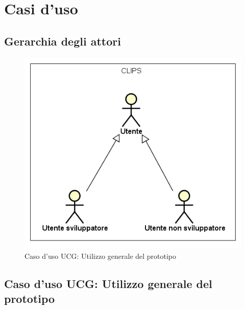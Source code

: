 \documentclass[../AnalisiDeiRequisiti.tex]{subfiles}
\begin{document}
\section{Casi d'uso}
\subsection{Gerarchia degli attori}
\begin{figure}[!h]
    \centering
    \includegraphics[scale=0.95, width=\textwidth]{img/diagramma_attori.png}
    \caption{Caso d'uso UCG: Utilizzo generale del prototipo}\label{fig:UCG} 
\end{figure}
\hypertarget{UCG}{}
\subsection{Caso d'uso UCG: Utilizzo generale del prototipo}
\end{document}
